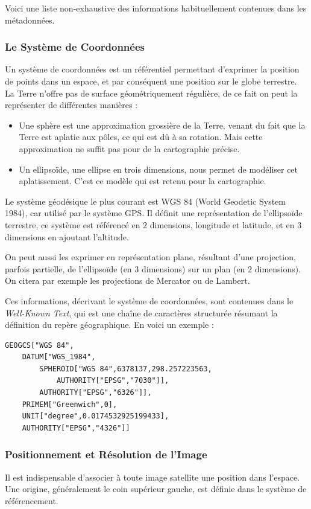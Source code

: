 \documentclass[a4paper, 11pt]{report}
\begin{document}
Voici une liste non-exhaustive des informations habituellement contenues dans les métadonnées.
\subsubsection{Le Système de Coordonnées}
Un système de coordonnées est un référentiel permettant d'exprimer la position de points dans un espace, et par conséquent une position sur le globe terrestre.
La Terre n'offre pas de surface géométriquement régulière, de ce fait on peut la représenter de différentes manières :
\begin{itemize}
	\item Une sphère est une approximation grossière de la Terre, venant du fait que la Terre est aplatie aux pôles, ce qui est dû à sa rotation. Mais cette approximation ne suffit pas pour de la cartographie précise.
	\item Un ellipsoïde, une ellipse en trois dimensions, nous permet de modéliser cet aplatissement. C'est ce modèle qui est retenu pour la cartographie.
\end{itemize}

Le système géodésique le plus courant est WGS 84 (World Geodetic System 1984), car utilisé par le système GPS. Il définit une représentation de l'ellipsoïde terrestre, ce système est référencé en $2$ dimensions, longitude et latitude, et en $3$ dimensions en ajoutant l'altitude.

On peut aussi les exprimer en représentation plane, résultant d'une projection, parfois partielle, de l'ellipsoïde (en $3$ dimensions) sur un plan (en $2$ dimensions). On citera par exemple les projections de Mercator ou de Lambert.

Ces informations, décrivant le système de coordonnées, sont contenues dans le \emph{Well-Known Text}, qui est une chaîne de caractères structurée résumant la définition du repère géographique. En voici un exemple :

\begin{verbatim}
GEOGCS["WGS 84",
    DATUM["WGS_1984",
        SPHEROID["WGS 84",6378137,298.257223563,
            AUTHORITY["EPSG","7030"]],
        AUTHORITY["EPSG","6326"]],
    PRIMEM["Greenwich",0],
    UNIT["degree",0.0174532925199433],
    AUTHORITY["EPSG","4326"]]
\end{verbatim}

\subsubsection{Positionnement et Résolution de l'Image}
Il est indispensable d'associer à toute image satellite une position dans l'espace. Une origine, généralement le coin supérieur gauche, est définie dans le système de référencement.
\end{document}
